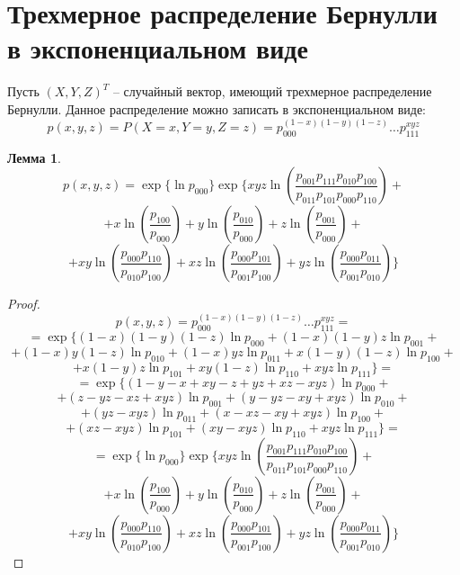 \documentclass[a4paper,14pt]{extarticle}
\theoremstyle{definition}
\newtheorem{lemma}{Лемма}[section]
\begin{document}
\section{Трехмерное распределение Бернулли в экспоненциальном виде}
Пусть $(X,Y,Z)^T$ -- случайный вектор, имеющий трехмерное распределение Бернулли.
Данное распределение можно записать в экспоненциальном виде:
$$p(x,y,z)=P(X=x,Y=y,Z=z)=p_{000}^{(1-x)(1-y)(1-z)} \ldots p_{111}^{x y z}$$

\begin{lemma}\label{factorization}
    $$
        p(x,y,z)= \exp \Biggl\{ \ln p_{000} \Biggr\}
        \exp \Biggl\{  xyz \ln  \left(\dfrac{p_{001}p_{111}p_{010}p_{100}}{p_{011}p_{101}p_{000}p_{110}}\right) +$$
    $$ +
        x \ln\left(\dfrac{p_{100}}{p_{000}}\right) +  y \ln\left(\dfrac{p_{010}}{p_{000}}\right) +
        z \ln\left(\dfrac{p_{001}}{p_{000}}\right) +
    $$
    $$
        + xy \ln \left(\dfrac{p_{000}p_{110}}{p_{010}p_{100}}\right) +
        xz \ln \left(\dfrac{p_{000}p_{101}}{p_{001}p_{100}}\right) +
        yz \ln \left(\dfrac{p_{000}p_{011}}{p_{001}p_{010}}\right) \Biggr\}
    $$
\end{lemma}

\begin{proof}
    $$
        p(x,y,z) = p_{000}^{(1-x)(1-y)(1-z)} \ldots p_{111}^{x y z} =
    $$
    $$
        =\exp \Biggl\{ (1-x)(1-y)(1-z) \ln p_{000} +
        (1-x)(1-y)z \ln p_{001}+
    $$
    $$
        + (1-x)y(1-z) \ln p_{010} + (1-x)y z \ln p_{011} +  x(1-y)(1-z) \ln p_{100} +
    $$
    $$
        +   x(1-y) z \ln p_{101}
        +   x y (1-z) \ln p_{110} +   x y z \ln p_{111} \Biggr\} =
    $$
    $$
        =\exp \Biggl\{   ( 1 - y -  x +  x y
        -  z +  y z +  x z -  x y z ) \ln p_{000} +
    $$
    $$
        +    (z -  y z -  x z +  x y z) \ln p_{001}  +
          (y -  y z -  x y +  x y z)  \ln p_{010} +
    $$
    $$
        +    (y z -  x y z ) \ln p_{011} +
           (x -  x z -  x y +  x y z ) \ln p_{100} +
    $$
    $$
        +   (x z -  x y z ) \ln p_{101} +   (x y -  x y z) \ln p_{110} +
          x y z \ln p_{111} \Biggr\}=
    $$
    $$
        = \exp \Biggl\{ \ln p_{000} \Biggr\}
        \exp \Biggl\{  xyz \ln  \left(\dfrac{p_{001}p_{111}p_{010}p_{100}}{p_{011}p_{101}p_{000}p_{110}}\right) +$$
    $$ +
        x \ln\left(\dfrac{p_{100}}{p_{000}}\right) +  y \ln\left(\dfrac{p_{010}}{p_{000}}\right) +
        z \ln\left(\dfrac{p_{001}}{p_{000}}\right) +
    $$
    $$
        + xy \ln \left(\dfrac{p_{000}p_{110}}{p_{010}p_{100}}\right) +
        xz \ln \left(\dfrac{p_{000}p_{101}}{p_{001}p_{100}}\right) +
        yz \ln \left(\dfrac{p_{000}p_{011}}{p_{001}p_{010}}\right) \Biggr\}
    $$
\end{proof}
\end{document}
